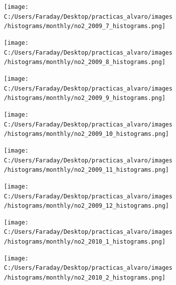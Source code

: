 \documentclass[12pt]{article}
\begin{document}
\newpage

\begin{figure}[H]
\centering
\begin{subfigure}[h]{0.45\textwidth}
\texttt{[image: C:/Users/Faraday/Desktop/practicas\_alvaro/images/histograms/monthly/no2\_2009\_7\_histograms.png]}
\caption{}
\label{fig:hist-mon-1-7-2009}
\end{subfigure}
%
\begin{subfigure}[H]{0.45\textwidth}
\texttt{[image: C:/Users/Faraday/Desktop/practicas\_alvaro/images/histograms/monthly/no2\_2009\_8\_histograms.png]}
\caption{}
\label{fig:hist-mon-1-8-2009}
\end{subfigure}
\caption{}
\end{figure}

\begin{figure}[H]
\centering
\begin{subfigure}[h]{0.45\textwidth}
\texttt{[image: C:/Users/Faraday/Desktop/practicas\_alvaro/images/histograms/monthly/no2\_2009\_9\_histograms.png]}
\caption{}
\label{fig:hist-mon-1-9-2009}
\end{subfigure}
%
\begin{subfigure}[H]{0.45\textwidth}
\texttt{[image: C:/Users/Faraday/Desktop/practicas\_alvaro/images/histograms/monthly/no2\_2009\_10\_histograms.png]}
\caption{}
\label{fig:hist-mon-1-10-2009}
\end{subfigure}
\caption{}
\end{figure}

\begin{figure}[H]
\centering
\begin{subfigure}[h]{0.45\textwidth}
\texttt{[image: C:/Users/Faraday/Desktop/practicas\_alvaro/images/histograms/monthly/no2\_2009\_11\_histograms.png]}
\caption{}
\label{fig:hist-mon-1-11-2009}
\end{subfigure}
%
\begin{subfigure}[H]{0.45\textwidth}
\texttt{[image: C:/Users/Faraday/Desktop/practicas\_alvaro/images/histograms/monthly/no2\_2009\_12\_histograms.png]}
\caption{}
\label{fig:hist-mon-1-12-2009}
\end{subfigure}
\caption{}
\end{figure}

\newpage

\begin{figure}[H]
\centering
\begin{subfigure}[h]{0.45\textwidth}
\texttt{[image: C:/Users/Faraday/Desktop/practicas\_alvaro/images/histograms/monthly/no2\_2010\_1\_histograms.png]}
\caption{}
\label{fig:hist-mon-1-1-2010}
\end{subfigure}
%
\begin{subfigure}[H]{0.45\textwidth}
\texttt{[image: C:/Users/Faraday/Desktop/practicas\_alvaro/images/histograms/monthly/no2\_2010\_2\_histograms.png]}
\caption{}
\label{fig:hist-mon-1-2-2010}
\end{subfigure}
\caption{}
\end{figure}
\end{document}

